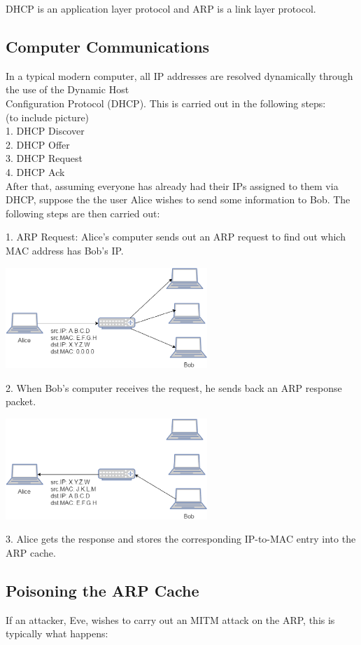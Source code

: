 \documentclass{acm_proc_article-sp}
\begin{document}
DHCP is an application layer protocol and ARP is a link layer protocol.

\subsection{Computer Communications}
In a typical modern computer, all IP addresses are resolved dynamically through the use of the Dynamic Host \\Configuration Protocol (DHCP). This is carried out in the following steps: \\
(to include picture) \\
1. DHCP Discover \\
2. DHCP Offer \\
3. DHCP Request \\
4. DHCP Ack \\ 

After that, assuming everyone has already had their IPs assigned to them via DHCP, suppose the the user Alice wishes to send some information to Bob. The following steps are then carried out: 

1. ARP Request: Alice's computer sends out an ARP request to find out which MAC address has Bob's IP. 

\includegraphics[width=3in]{ARP_Request.eps}

2. When Bob's computer receives the request, he sends back an ARP response packet. 

\includegraphics[width=3in]{ARP_Response.eps}

3. Alice gets the response and stores the corresponding IP-to-MAC entry into the ARP cache. 


\subsection{Poisoning the ARP Cache}
If an attacker, Eve, wishes to carry out an MITM attack on the ARP, this is typically what happens: 
\end{document}
